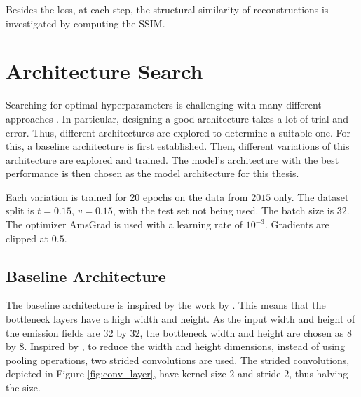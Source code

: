 Besides the loss, at each step, the structural similarity of reconstructions is investigated by computing the \gls{SSIM}.

\section{Architecture Search} \label{section:architecture_search}
Searching for optimal hyperparameters is challenging with many different approaches \parencite{HyperParameters}.
In particular, designing a good architecture takes a lot of trial and error.
Thus, different architectures are explored to determine a suitable one.
For this, a baseline architecture is first established.
Then, different variations of this architecture are explored and trained.
The model's architecture with the best performance is then chosen as the model architecture for this thesis.

Each variation is trained for $20$ epochs on the data from $2015$ only.
The dataset split is $t=0.15$, $v=0.15$, with the test set not being used.
The batch size is $32$.
The optimizer AmsGrad \parencite{AmsGrad} is used with a learning rate of $10^{-3}$.
Gradients are clipped at $0.5$.

\subsection{Baseline Architecture}
The baseline architecture is inspired by the work by \textcite{Tightrope}.
This means that the bottleneck layers have a high width and height.
As the input width and height of the emission fields are $32$ by $32$, the bottleneck width and height are chosen as $8$ by $8$.
Inspired by \textcite{AllConvolutional}, to reduce the width and height dimensions, instead of using pooling operations, two strided convolutions are used.
The strided convolutions, depicted in Figure \ref{fig:conv_layer}, have kernel size $2$ and stride $2$, thus halving the size.

